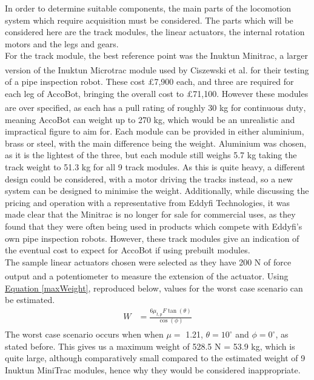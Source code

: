 \documentclass[11pt]{article}		%
\newcommand{\supercite}[1]{\textsuperscript{\cite{#1}}}		%
\newcommand{\equationref}[1]{\hyperref[#1]{Equation \ref*{#1}}}     %
\begin{document}
			In order to determine suitable components, the main parts of the locomotion system which require acquisition must be considered.
			The parts which will be considered here are the track modules, the linear actuators, the internal rotation motors and the legs and gears.
			\\
			For the track module, the best reference point was the Inuktun Minitrac, a larger version of the Inuktun Microtrac module used by Ciszewski et al.\supercite{ciszewski2015design} for their testing of a pipe inspection robot.
			These cost £7,900 each, and three are required for each leg of AccoBot, bringing the overall cost to £71,100.
			However these modules are over specified, as each has a pull rating of roughly 30 kg for continuous duty\supercite{inuktunTracks}, meaning AccoBot can weight up to 270 kg, which would be an unrealistic and impractical figure to aim for.
			Each module can be provided in either aluminium, brass or steel, with the main difference being the weight.
			Aluminium was chosen, as it is the lightest of the three, but each module still weighs 5.7 kg taking the track weight to 51.3 kg for all 9 track modules.
			As this is quite heavy, a different design could be considered, with a motor driving the tracks instead, so a new system can be designed to minimise the weight.
			Additionally, while discussing the pricing and operation with a representative from Eddyfi Technologies, it was made clear that the Minitrac is no longer for sale for commercial uses, as they found that they were often being used in products which compete with Eddyfi's own pipe inspection robots.
			However, these track modules give an indication of the eventual cost to expect for AccoBot if using prebuilt modules.
			\\
			The sample linear actuators chosen were selected as they have 200 N of force output and a potentiometer to measure the extension of the actuator\supercite{rsproLinear}.
			Using \equationref{maxWeight}, reproduced below, values for the worst case scenario can be estimated.
			\begin{align*}
				W &= \frac{6 \mu_{t,p} F \tan \left( \theta \right)}{\cos \left( \phi \right)}
			\end{align*}
			The worst case scenario occurs when when $\mu =$ 1.21\supercite{sato2011development}, $\theta = 10^\circ$ and $\phi = 0^\circ$, as stated before.
			This gives us a maximum weight of 528.5 N = 53.9 kg, which is quite large, although comparatively small compared to the estimated weight of 9 Inuktun MiniTrac modules, hence why they would be considered inappropriate.
\end{document}
